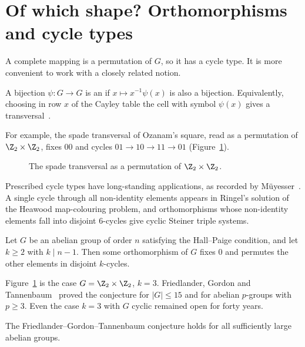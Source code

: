 \section{Of which shape? Orthomorphisms and cycle types}\label{sec:cycle-types}

A complete mapping is a permutation of $G$, so it has a cycle type. It is more convenient to work with a closely related notion.

\begin{definition}\label{def:orthomorphism}
A bijection $\psi\colon G\to G$ is an  if $x\mapsto x^{-1}\psi(x)$ is also a bijection. Equivalently, choosing in row $x$ of the Cayley table the cell with symbol $\psi(x)$ gives a transversal~\cite{wan07}.
\end{definition}

For example, the spade transversal of Ozanam's square, read as a permutation of $\Z_2\times\Z_2$, fixes $00$ and cycles $01\to10\to11\to01$ (Figure~\ref{fig:ortho-cycle}).

\begin{figure}[ht]
\centering

\caption{The spade transversal as a permutation of $\Z_2\times\Z_2$.}
\label{fig:ortho-cycle}
\end{figure}

Prescribed cycle types have long-standing applications, as recorded by M\"uyesser~\cite{muy23}. A single cycle through all non-identity elements appears in Ringel's solution of the Heawood map-colouring problem, and orthomorphisms whose non-identity elements fall into disjoint $6$-cycles give cyclic Steiner triple systems.

\begin{conjecture}\label{conj:fgt}
Let $G$ be an abelian group of order $n$ satisfying the Hall--Paige condition, and let $k\geq2$ with $k\mid n-1$. Then some orthomorphism of $G$ fixes $0$ and permutes the other elements in disjoint $k$-cycles.
\end{conjecture}

Figure~\ref{fig:ortho-cycle} is the case $G=\Z_2\times\Z_2$, $k=3$. Friedlander, Gordon and Tannenbaum~\cite{fgt81} proved the conjecture for $|G|\leq15$ and for abelian $p$-groups with $p\geq3$. Even the case $k=3$ with $G$ cyclic remained open for forty years.

\begin{theorem}\label{thm:fgt}
The Friedlander--Gordon--Tannenbaum conjecture holds for all sufficiently large abelian groups.
\end{theorem}

